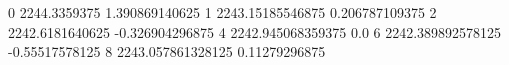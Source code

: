 0 2244.3359375 1.390869140625
1 2243.15185546875 0.206787109375
2 2242.6181640625 -0.326904296875
4 2242.945068359375 0.0
6 2242.389892578125 -0.55517578125
8 2243.057861328125 0.11279296875
